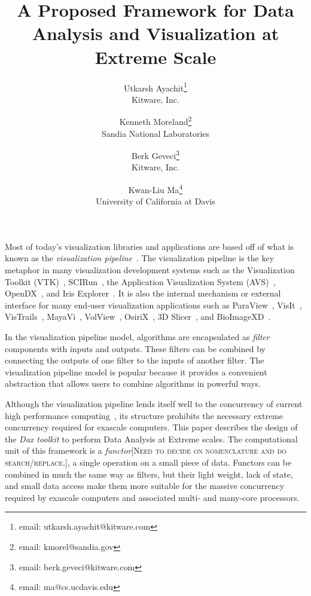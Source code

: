 \documentclass{vgtc}                          %
\title{A Proposed Framework for Data Analysis and Visualization at Extreme Scale}
\author{
  Utkarsh Ayachit\thanks{email: utkarsh.ayachit@kitware.com} \\ %
  \scriptsize Kitware, Inc. %
  \and %
  Kenneth Moreland\thanks{email: kmorel@sandia.gov} \\ %
  \scriptsize Sandia National Laboratories %
  \and %
  Berk Geveci\thanks{email: berk.geveci@kitware.com} \\ %
  \scriptsize Kitware, Inc. %
  \and %
  Kwan-Liu Ma\thanks{email: ma@cs.ucdavis.edu} \\ %
  \scriptsize University of California at Davis %
}
\newcommand*{\lcite}[1]{~\cite{#1}}
\newcommand*{\keyterm}[1]{\emph{#1}}
\newcommand{\sticky}[1]{{\color{red}\textsc{[#1]}}}
\begin{document}


\maketitle

\label{sec:Introduction}

Most of today's visualization libraries and applications are based off of
what is known as the \keyterm{visualization
  pipeline}\lcite{Haeberli88,Lucas92}.  The visualization pipeline is the
key metaphor in many visualization development systems such as the
Visualization Toolkit (VTK)\lcite{VTKBook}, SCIRun\lcite{SCIRunPaper}, the
Application Visualization System (AVS)\lcite{AVSPaper},
OpenDX\lcite{OpenDXPaper}, and Iris Explorer\lcite{IRISExplorerPaper}.  It
is also the internal mechanism or external interface for many end-user
visualization applications such as ParaView\lcite{ParaViewGuideBook},
VisIt\lcite{VisItBook}, VisTrails\lcite{VisTrailsPaper},
MayaVi\lcite{MayaViPaper}, VolView\lcite{VolViewBook},
OsiriX\lcite{OsiriXPaper}, 3D Slicer\lcite{3DSlicerPaper}, and
BioImageXD\lcite{BioImageXDPaper}.

In the visualization pipeline model, algorithms are encapsulated as
\keyterm{filter} components with inputs and outputs.  These filters can
be combined by connecting the outputs of one filter to the inputs of
another filter.  The visualization pipeline model is popular because it
provides a convenient abstraction that allows users to combine algorithms
in powerful ways.

Although the visualization pipeline lends itself well to the concurrency of
current high performance
computing\lcite{Moreland08,Patchett09,Pugmire08,White05}, its structure
prohibits the necessary extreme concurrency required for exascale
computers.  This paper describes the design of the \keyterm{Dax toolkit} to
perform Data Analysis at Extreme scales.  The computational unit of this
framework is a \keyterm{functor}\sticky{Need to decide on nomenclature and
  do search/replace.}, a single operation on a small piece of data.
Functors can be combined in much the same way as filters, but their light
weight, lack of state, and small data access make them more suitable for
the massive concurrency required by exascale computers and associated
multi- and many-core processors.
\end{document}
